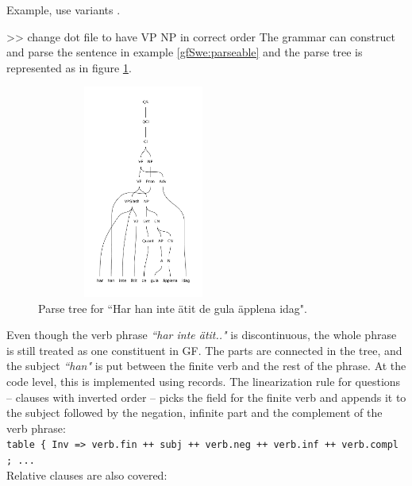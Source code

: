 \documentclass{report}
\begin{document}
Example, use variants {}.

>> change dot file to have VP NP in correct order
\label{gfSwe:parseable}
The grammar can construct and parse the sentence in example \ref{gfSwe:parseable}
and the parse tree is represented as in figure \ref{gfSwe:parsetree}.
\begin{figure}[h]
\includegraphics[width=70mm,height=70mm]{apples.pdf}
\caption{Parse tree for ``Har han inte ätit de gula äpplena idag".}
\label{gfSwe:parsetree}
\end{figure}
Even though the verb phrase \emph{``har inte ätit.."} is discontinuous, the whole
phrase is still treated as one constituent in GF. The parts
are connected in the tree, and the subject \emph{``han"} is put between the
finite verb and the rest of the phrase. At the code level, this is implemented
using records.
The linearization rule for questions -- clauses with inverted order -- picks 
the field for the finite verb and appends it to the subject followed by
the negation, infinite part and the complement of the verb phrase: \\
\verb|table { Inv => verb.fin ++ subj ++ verb.neg ++ verb.inf ++ verb.compl ; ... | \\

Relative clauses are also covered: 
\end{document}
